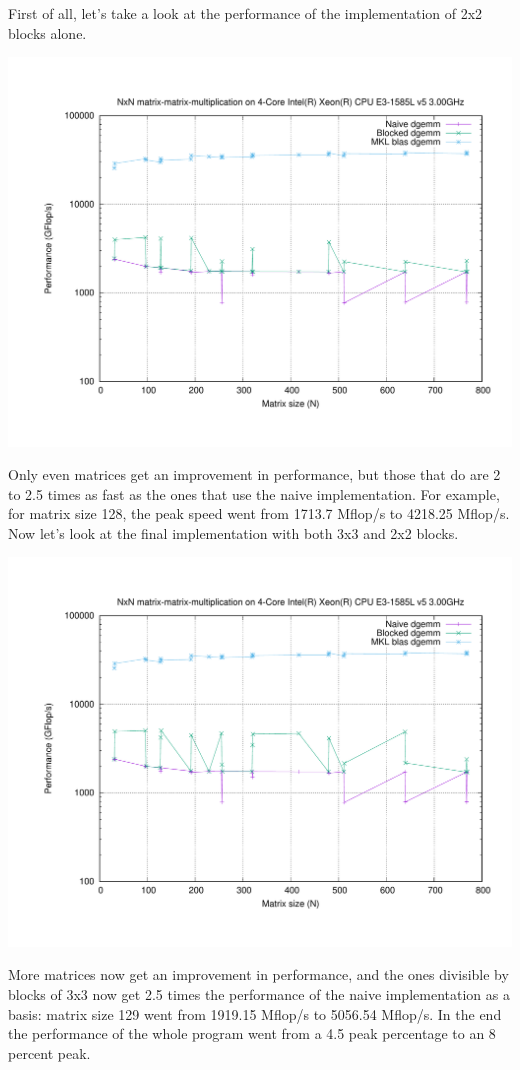 \documentclass[unicode,11pt,a4paper,oneside,numbers=endperiod,openany]{scrartcl}
\begin{document}
\newline
First of all, let's take a look at the performance of the implementation of 2x2 blocks alone.
\begin{center}
\includegraphics[width=0.7\linewidth]{timing_2x2_blocks_only_even_matrices.pdf}
\end{center}
Only even matrices get an improvement in performance, but those that do are 2 to 2.5 times as fast as the ones that use the naive implementation. For example, for matrix size 128, the peak speed went from 1713.7 Mflop/s to 4218.25 Mflop/s.
\newline
\newline
Now let's look at the final implementation with both 3x3 and 2x2 blocks.
\begin{center}
\includegraphics[width=0.7\linewidth]{timing_3x3_and_2x2.pdf}
\end{center}
More matrices now get an improvement in performance, and the ones divisible by blocks of 3x3 now get 2.5 times the performance of the naive implementation as a basis: matrix size 129 went from 1919.15 Mflop/s to 5056.54 Mflop/s.
\newline
In the end the performance of the whole program went from a 4.5 peak percentage to an 8 percent peak.
\end{document}
